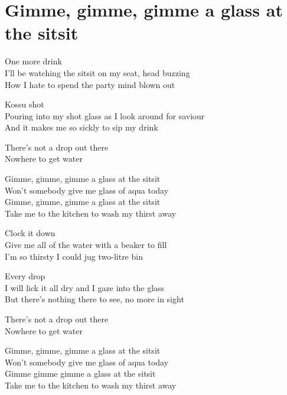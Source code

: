 \section{Gimme, gimme, gimme a glass at the sitsit}
One more drink\\
I’ll be watching the sitsit on my seat, head buzzing\\
How I hate to spend the party mind blown out

Kossu shot\\
Pouring into my shot glass as I look around for saviour\\
And it makes me so sickly to sip my drink

There’s not a drop out there\\
Nowhere to get water

Gimme, gimme, gimme a glass at the sitsit\\
Won’t somebody give me glass of aqua today\\
Gimme, gimme, gimme a glass at the sitsit\\
Take me to the kitchen to wash my thirst away

Clock it down\\
Give me all of the water with a beaker to fill\\
I’m so thirsty I could jug two-litre bin

Every drop\\
I will lick it all dry and I gaze into the glass\\
But there’s nothing there to see, no more in sight

There’s not a drop out there\\
Nowhere to get water

Gimme, gimme, gimme a glass at the sitsit\\
Won’t somebody give me glass of aqua today\\
Gimme gimme gimme a glass at the sitsit\\
Take me to the kitchen to wash my thirst away